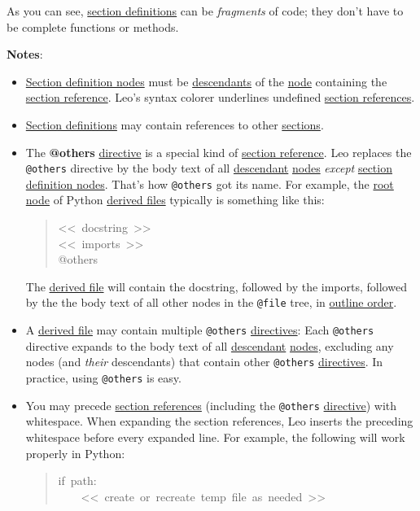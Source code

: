 \documentclass[10pt,a4paper,english]{article}
\begin{document}
As you can see, \href{glossary.html\#section-definitions}{section definitions} can be \emph{fragments} of code;
they don't have to be complete functions or methods.

\textbf{Notes}:
\begin{itemize}
\item {} 
\href{glossary.html\#section-definition-nodes}{Section definition nodes} must be \href{glossary.html\#descendants}{descendants} of the \href{glossary.html\#node}{node} containing the \href{glossary.html\#section-reference}{section reference}.
Leo's syntax colorer underlines undefined \href{glossary.html\#section-references}{section references}.

\item {} 
\href{glossary.html\#section-definitions}{Section definitions} may contain references to other \href{glossary.html\#section}{sections}.

\item {} 
The \textbf{@others} \href{\#leo-directives}{directive} is a special kind of \href{glossary.html\#section-reference}{section reference}.
Leo replaces the \texttt{@others} directive by the body text of all \href{glossary.html\#descendant}{descendant} \href{glossary.html\#nodes}{nodes}
\emph{except} \href{glossary.html\#section-definition-nodes}{section definition nodes}.
That's how \texttt{@others} got its name.
For example, the \href{glossary.html\#root}{root node} of Python \href{\#derived-files}{derived files} typically is something like this:
\begin{quote}{\ttfamily \raggedright \noindent
<{}<~docstring~>{}>~\\
<{}<~imports~>{}>~\\
@others
}\end{quote}

The \href{\#derived-files}{derived file} will contain the docstring, followed by the imports, followed by the
the body text of all other nodes in the \texttt{@file} tree, in \href{glossary.html\#outline-order}{outline order}.

\item {} 
A \href{\#derived-files}{derived file} may contain multiple \texttt{@others} \href{\#leo-directives}{directives}: Each
\texttt{@others} directive expands to the body text of all \href{glossary.html\#descendant}{descendant} \href{glossary.html\#nodes}{nodes},
excluding any nodes (and \emph{their} descendants) that contain other \texttt{@others}
\href{\#leo-directives}{directives}. In practice, using \texttt{@others} is easy.

\item {} 
You may precede \href{glossary.html\#section-references}{section references} (including the \texttt{@others} \href{\#leo-directives}{directive})
with whitespace. When expanding the section references, Leo inserts the
preceding whitespace before every expanded line. For example, the following
will work properly in Python:
\begin{quote}{\ttfamily \raggedright \noindent
if~path:~\\
~~~~<{}<~create~or~recreate~temp~file~as~needed~>{}>
}\end{quote}

\end{itemize}
\end{document}
